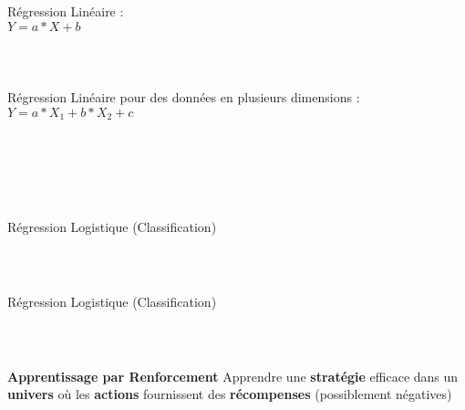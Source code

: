 \begin{frame}
  \frametitle{~}
  Régression Linéaire : \\
  $Y = a*X + b$
\end{frame}

\begin{frame}
  \frametitle{~}
  Régression Linéaire pour des données en plusieurs dimensions : \\
  $Y = a*X_1 + b*X_2 + c$
\end{frame}

\begin{frame}
  \frametitle{~}
\end{frame}

\begin{frame}
  \frametitle{~}
  Régression Logistique (Classification)
\end{frame}

\begin{frame}
  \frametitle{~}
  Régression Logistique (Classification)
\end{frame}

\begin{frame}
  \frametitle{~}
  \textbf{Apprentissage par Renforcement}
  \newline \newline
  Apprendre une \textbf{stratégie} efficace dans un \textbf{univers} où les \textbf{actions} fournissent des \textbf{récompenses} (possiblement négatives)
  \newline
  \begin{minipage}[l]{0.39\linewidth}
    $\;$ \\
  \end{minipage}\hfill
  \begin{minipage}[l]{0.59\linewidth}
    $\;$ \\
  \end{minipage}\hfill
\end{frame}

\begin{frame}
  \frametitle{~}
\end{frame}

